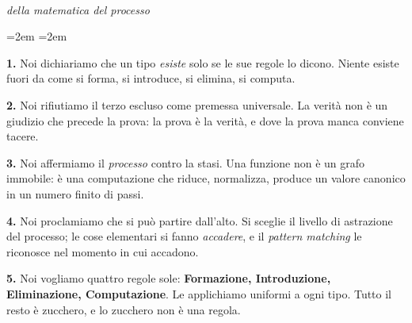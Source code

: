 \documentclass[
  oneside,
  openany,
  titlepage,
  11pt,
  a4paper,
  italian,
  DIV=14,
  headinclude,
  footinclude=true,
  cleardoublepage=empty
]{scrbook}
\theoremstyle{ctplain}
\theoremstyle{ctdef}
\theoremstyle{ctrem}
\theoremstyle{ctcero}
\begin{document}
\begin{titlepage}
\end{titlepage}
\clearpage

\thispagestyle{empty}
\vspace*{2cm}
\begin{center}
{\sffamily\bfseries\fontsize{30}{34}\selectfont\color{halfgray}
}\\[6pt]
{\itshape\small della matematica del processo}
\end{center}
\vspace{1.2cm}

\begingroup
\setlength{\parindent}{0pt}
\setlength{\parskip}{0.55\baselineskip}
\leftskip=2em \rightskip=2em

{\color{halfgray}\sffamily\bfseries 1.}\quad
Noi dichiariamo che un tipo \emph{esiste} solo se le sue regole lo dicono. Niente esiste fuori da come si forma, si introduce, si elimina, si computa.

{\color{halfgray}\sffamily\bfseries 2.}\quad
Noi rifiutiamo il terzo escluso come premessa universale. La verit\`a non \`e un giudizio che precede la prova: la prova \`e la verit\`a, e dove la prova manca conviene tacere.

{\color{halfgray}\sffamily\bfseries 3.}\quad
Noi affermiamo il \emph{processo} contro la stasi. Una funzione non \`e un grafo immobile: \`e una computazione che riduce, normalizza, produce un valore canonico in un numero finito di passi.

{\color{halfgray}\sffamily\bfseries 4.}\quad
Noi proclamiamo che si pu\`o partire dall'alto. Si sceglie il livello di astrazione del processo; le cose elementari si fanno \emph{accadere}, e il \emph{pattern matching} le riconosce nel momento in cui accadono.

{\color{halfgray}\sffamily\bfseries 5.}\quad
Noi vogliamo quattro regole sole: \textbf{Formazione, Introduzione, Eliminazione, Computazione}. Le applichiamo uniformi a ogni tipo. Tutto il resto \`e zucchero, e lo zucchero non \`e una regola.
\end{document}
